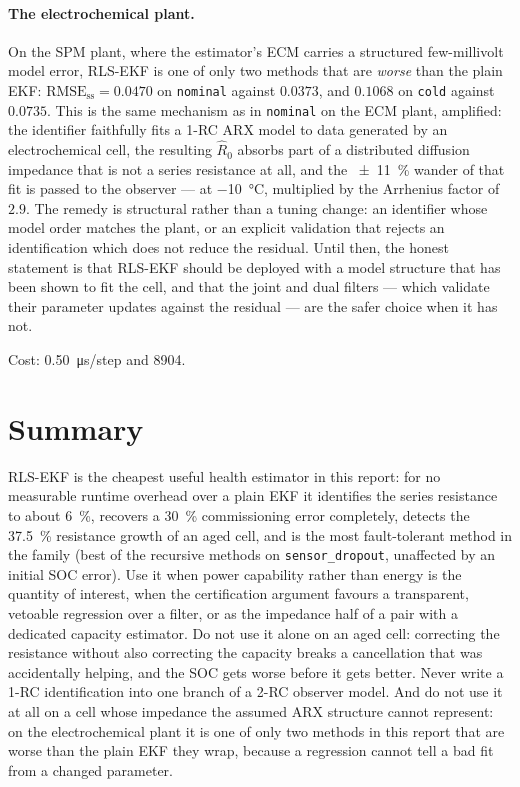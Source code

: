 \paragraph{The electrochemical plant.}  On the SPM plant, where the estimator's ECM carries a
structured few-millivolt model error, RLS-EKF is one of only two methods that are \emph{worse} than
the plain EKF: $\text{RMSE}_\text{ss}=0.0470$ on \texttt{nominal} against $0.0373$, and $0.1068$ on
\texttt{cold} against $0.0735$.  This is the same mechanism as in \texttt{nominal} on the ECM plant,
amplified: the identifier faithfully fits a 1-RC ARX model to data generated by an electrochemical
cell, the resulting $\hat R_0$ absorbs part of a distributed diffusion impedance that is not a series
resistance at all, and the \SI{\pm11}{\percent} wander of that fit is passed to the observer ---
at \SI{-10}{\celsius}, multiplied by the Arrhenius factor of $2.9$.  The remedy is structural rather
than a tuning change: an identifier whose model order matches the plant, or an explicit validation
that rejects an identification which does not reduce the residual.  Until then, the honest statement
is that RLS-EKF should be deployed with a model structure that has been shown to fit the cell, and
that the joint and dual filters --- which validate their parameter updates against the residual
--- are the safer choice when it has not.

Cost: \SI{0.50}{\micro\second}/step and \SI{8904}{\byte}.

\section{Summary}
RLS-EKF is the cheapest useful health estimator in this report: for no measurable runtime overhead
over a plain EKF it identifies the series resistance to about \SI{6}{\percent}, recovers a
\SI{30}{\percent} commissioning error completely, detects the \SI{37.5}{\percent} resistance growth
of an aged cell, and is the most fault-tolerant method in the family (best of the recursive methods
on \texttt{sensor\_dropout}, unaffected by an initial SOC error).  Use it when power capability rather
than energy is the quantity of interest, when the certification argument favours a transparent,
vetoable regression over a filter, or as the impedance half of a pair with a dedicated capacity
estimator.  Do not use it alone on an aged cell: correcting the resistance without also correcting
the capacity breaks a cancellation that was accidentally helping, and the SOC gets worse before it
gets better.  Never write a 1-RC identification into one branch of a 2-RC observer model.  And do not use it at
all on a cell whose impedance the assumed ARX structure cannot represent: on the electrochemical
plant it is one of only two methods in this report that are worse than the plain EKF they wrap,
because a regression cannot tell a bad fit from a changed parameter.
